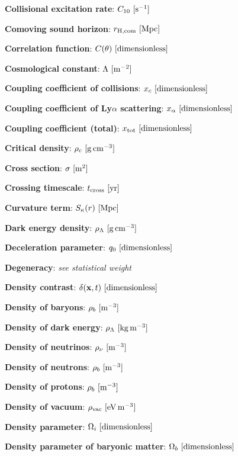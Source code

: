 \documentclass[a4paper,11pt]{article}
\begin{document}
{\noindent}\textbf{Collisional excitation rate}: $C_{10} ~ [{\rm s^{-1}}]$

{\noindent}\textbf{Comoving sound horizon}: $r_\mathrm{H,com} ~ [{\rm Mpc}]$

{\noindent}\textbf{Correlation function}: $C(\theta) ~ [{\rm dimensionless}]$

{\noindent}\textbf{Cosmological constant}: $\Lambda ~ [{\rm m^{-2}}]$

{\noindent}\textbf{Coupling coefficient of collisions}: $x_c ~ [{\rm dimensionless}]$

{\noindent}\textbf{Coupling coefficient of Ly$\alpha$ scattering}: $x_\alpha ~ [{\rm dimensionless}]$

{\noindent}\textbf{Coupling coefficient (total)}: $x_\mathrm{tot} ~ [{\rm dimensionless}]$

{\noindent}\textbf{Critical density}: $\rho_c ~ [{\rm g\,cm^{-3}}]$

{\noindent}\textbf{Cross section}: $\sigma ~ [{\rm m^{2}}]$

{\noindent}\textbf{Crossing timescale}: $t_\mathrm{cross} ~ [{\rm yr}]$

{\noindent}\textbf{Curvature term}: $S_\kappa(r) ~ [{\rm Mpc}]$

{\noindent}\textbf{Dark energy density}: $\rho_\Lambda ~ [{\rm g\,cm^{-3}}]$

{\noindent}\textbf{Deceleration parameter}: $q_0 ~ [{\rm dimensionless}]$

{\noindent}\textbf{Degeneracy}: \textit{see statistical weight}

{\noindent}\textbf{Density contrast}: $\delta(\mathbf{x},t) ~ [{\rm dimensionless}]$

{\noindent}\textbf{Density of baryons}: $\rho_b ~ [{\rm m^{-3}}]$

{\noindent}\textbf{Density of dark energy}: $\rho_\Lambda ~ [{\rm kg\,m^{-3}}]$

{\noindent}\textbf{Density of neutrinos}: $\rho_\nu ~ [{\rm m^{-3}}]$

{\noindent}\textbf{Density of neutrons}: $\rho_b ~ [{\rm m^{-3}}]$

{\noindent}\textbf{Density of protons}: $\rho_b ~ [{\rm m^{-3}}]$

{\noindent}\textbf{Density of vacuum}: $\rho_\mathrm{vac} ~ [{\rm eV\,m^{-3}}]$

{\noindent}\textbf{Density parameter}: $\Omega_i ~ [{\rm dimensionless}]$

{\noindent}\textbf{Density parameter of baryonic matter}: $\Omega_b ~ [{\rm dimensionless}]$
\end{document}
